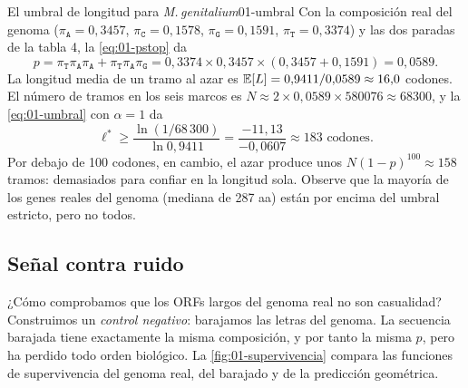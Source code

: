 \begin{ejemplo}{El umbral de longitud para \emph{M.\,genitalium}}{01-umbral}
Con la composición real del genoma ($\pi_\texttt{A}=0{,}3457$, $\pi_\texttt{C}=0{,}1578$, $\pi_\texttt{G}=0{,}1591$, $\pi_\texttt{T}=0{,}3374$) y las dos paradas de la tabla 4, la \cref{eq:01-pstop} da
\[
p = \pi_\texttt{T}\pi_\texttt{A}\pi_\texttt{A} + \pi_\texttt{T}\pi_\texttt{A}\pi_\texttt{G}
= 0{,}3374\times0{,}3457\times(0{,}3457+0{,}1591) = 0{,}0589 .
\]
La longitud media de un tramo al azar es $\mathbb{E}[L]=0{,}9411/0{,}0589\approx16{,}0$ codones. El número de tramos en los seis marcos es $N\approx 2\times0{,}0589\times\num{580076}\approx\num{68300}$, y la \cref{eq:01-umbral} con $\alpha=1$ da
\[
\ell^* \ge \frac{\ln(1/68\,300)}{\ln 0{,}9411} = \frac{-11{,}13}{-0{,}0607}\approx 183 \text{ codones}.
\]
Por debajo de 100 codones, en cambio, el azar produce unos $N(1-p)^{100}\approx 158$ tramos: demasiados para confiar en la longitud sola. Observe que la mayoría de los genes reales del genoma (mediana de 287 aa) están por encima del umbral estricto, pero no todos.
\end{ejemplo}

\subsection{Señal contra ruido}

¿Cómo comprobamos que los ORFs largos del genoma real no son casualidad? Construimos un \emph{control negativo}: barajamos las letras del genoma. La secuencia barajada tiene exactamente la misma composición, y por tanto la misma $p$, pero ha perdido todo orden biológico. La \cref{fig:01-supervivencia} compara las funciones de supervivencia del genoma real, del barajado y de la predicción geométrica.

